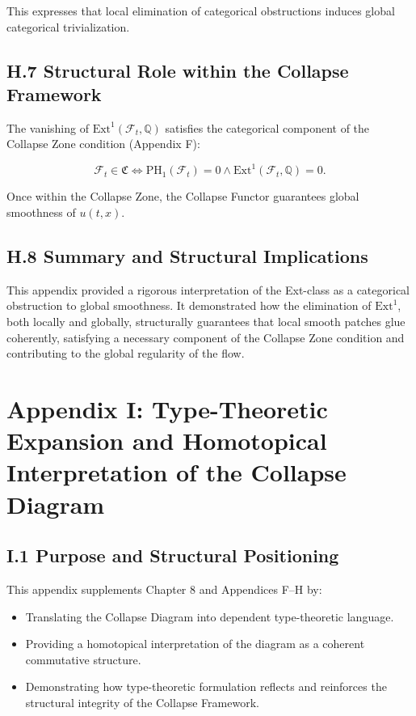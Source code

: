 \documentclass[11pt]{article}
\begin{document}
This expresses that local elimination of categorical obstructions induces global categorical trivialization.

\subsection*{H.7 Structural Role within the Collapse Framework}

The vanishing of \( \mathrm{Ext}^1(\mathcal{F}_t, \mathbb{Q}) \) satisfies the categorical component of the Collapse Zone condition (Appendix F):

\[
\mathcal{F}_t \in \mathfrak{C} \iff \mathrm{PH}_1(\mathcal{F}_t) = 0 \land \mathrm{Ext}^1(\mathcal{F}_t, \mathbb{Q}) = 0.
\]

Once within the Collapse Zone, the Collapse Functor guarantees global smoothness of \( u(t, x) \).

\subsection*{H.8 Summary and Structural Implications}

This appendix provided a rigorous interpretation of the Ext-class as a categorical obstruction to global smoothness.  
It demonstrated how the elimination of \( \mathrm{Ext}^1 \), both locally and globally, structurally guarantees that local smooth patches glue coherently, satisfying a necessary component of the Collapse Zone condition and contributing to the global regularity of the flow.



\section*{Appendix I: Type-Theoretic Expansion and Homotopical Interpretation of the Collapse Diagram}

\subsection*{I.1 Purpose and Structural Positioning}

This appendix supplements Chapter 8 and Appendices F–H by:

\begin{itemize}
  \item Translating the Collapse Diagram into dependent type-theoretic language.
  \item Providing a homotopical interpretation of the diagram as a coherent commutative structure.
  \item Demonstrating how type-theoretic formulation reflects and reinforces the structural integrity of the Collapse Framework.
\end{itemize}
\end{document}
